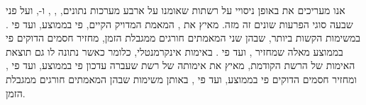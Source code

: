 {אנו מעריכים את \LRE{\tool} באופן ניסויי על רשתות שאומנו על ארבע מערכות נתונים, ,
,  ו-, ועל פני שבעה סוגי הפרעות שונים זה
מזה. \LRE{\tool} מאיץ את \LRE{\baseline}, המאמת המדויק הקיים, פי  בממוצע,
ועד פי . במשימות הקשות ביותר, שבהן שני המאמתים חורגים ממגבלת הזמן, \LRE{\tool}
מחזיר חסמים הדוקים פי  בממוצע מאלה שמחזיר \LRE{\baseline}, ועד פי
. באימות אינקרמנטלי, כלומר כאשר נתונה לו גם תוצאת האימות של הרשת הקודמת,
\LRE{\tool} מאיץ את אימותה של רשת שעברה עדכון פי  בממוצע, ועד פי
, ומחזיר חסמים הדוקים פי  בממוצע, ועד פי , באותן
משימות שבהן המאמתים חורגים ממגבלת הזמן.

}
